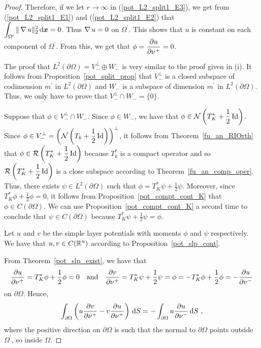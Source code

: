 \begin{proof}
Therefore, if we let $r \to \infty$ in (\ref{pot_L2_split1_E3}), we
get from (\ref{pot_L2_split1_E1}) and (\ref{pot_L2_split1_E2}) that\\
$\displaystyle \int_{\Omega^{\prime}} \|\operatorname{\nabla} u\|_2^2 \,\mathrm{d}{{\bm{x}}} = 0$.
Thus $\operatorname{\nabla} u = 0$ on $\displaystyle \Omega^{\prime}$.  This shows that $u$ is
constant on each component of $\displaystyle \Omega^{\prime}$.  From
this, we get that $\displaystyle \phi = \frac{\partial{u}}{\partial \nu^+} = 0$.

 The proof that
$\displaystyle L^2(\partial \Omega) = V_-^\perp \oplus W_-$ is very
similar to the proof given in (i). It
follows from Proposition~\ref{pot_split_prop} that $V_-^\perp$ is a
closed subspace of codimension $\displaystyle m^{\prime}$ in
$\displaystyle L^2(\partial \Omega)$ and $W_-$
is a subspace of dimension $\displaystyle m^{\prime}$ in
$\displaystyle L^2(\partial \Omega)$.  Thus, we
only have to prove that $\displaystyle V_-^\perp \cap W_- = \{0\}$.

Suppose that $\displaystyle \phi \in V_-^\perp \cap W_-$.
Since $\phi \in W_-$, we have that
$\displaystyle \phi \in \mathcal{N} \left(T^\ast_K + \frac{1}{2} \operatorname{Id}\right)$.
Since $\displaystyle \phi \in V_-^\perp
= \left(\mathcal{N} \left(T_k + \frac{1}{2} \operatorname{Id}\right)\right)^\perp$,
it follows from Theorem~\ref{fu_an_RIOrth} that
$\displaystyle \phi \in \mathcal{R} \left( T^\ast_K + \frac{1}{2} \operatorname{Id}\right)$ because
$\displaystyle T_k^\ast$ is a compact operator
and so $\displaystyle \mathcal{R} \left( T^\ast_K + \frac{1}{2} \operatorname{Id}\right)$
is a close subspace according to Theorem~\ref{fu_an_comp_oper}.  Thus, there
exists $\displaystyle \psi \in L^2(\partial \Omega)$ such that
$\displaystyle \phi = T^\ast_K \psi + \frac{1}{2} \psi$.  Moreover,
since $\displaystyle T^\ast_K\phi + \frac{1}{2} \phi = 0$, it follows
from Proposition~\ref{pot_compt_cont_K} that
$\phi \in C(\partial \Omega)$.  We can use 
Proposition~\ref{pot_compt_cont_K} a second time to conclude that
$\psi \in C(\partial \Omega)$ because
$\displaystyle T^\ast_K \psi + \frac{1}{2} \psi = \phi$.

Let $u$ and $v$ be the simple layer potentials with moments $\phi$ and
$\psi$ respectively.    We have that $\displaystyle u,v \in C(\mathbb{R}^n)$
according to Proposition~\ref{pot_slp_cont}.

From Theorem~\ref{pot_slp_exist}, we have that
\[
  \frac{\partial{u}}{\partial \nu^+} = T^\ast_K \phi + \frac{1}{2} \phi = 0
\quad \text{and} \quad
  \frac{\partial{v}}{\partial \nu^+} = T^\ast_K \psi + \frac{1}{2} \psi
= \phi = - T^\ast_K \phi + \frac{1}{2} \phi
= - \frac{\partial{u}}{\partial \nu^-}
\]
on $\partial \Omega$.  Hence,
\begin{equation} \label{pot_L2_split1_E4}
\int_{\partial \Omega} \left( u \frac{\partial{v}}{\partial \nu^+}
- v \frac{\partial{u}}{\partial \nu^+} \right) \,\mathrm{d}{S}
= - \int_{\partial \Omega} u \frac{\partial{u}}{\partial \nu^-} \,\mathrm{d}{S} \ ,
\end{equation}
where the positive direction on $\partial \Omega$ is such that the
normal to $\partial \Omega$ points outside
$\displaystyle \Omega^{\prime}$, so inside $\Omega$.


\end{proof}
